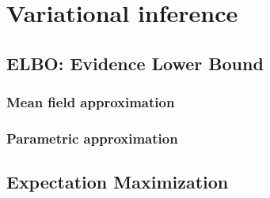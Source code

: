 \documentclass[a4paper,10pt]{book}
\begin{document}
    
        
\chapter{Variational inference}

\section{ELBO: Evidence Lower Bound}



\subsection{Mean field approximation}



\subsection{Parametric approximation}



\section{Expectation Maximization}


\end{document}
